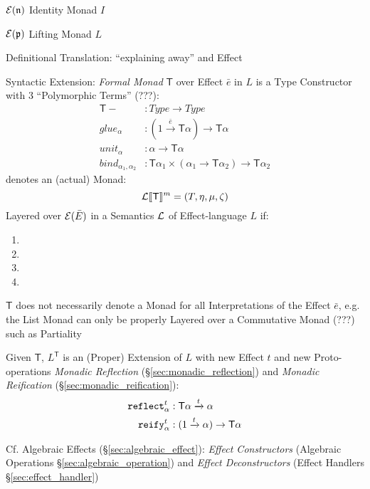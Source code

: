 $\mathcal{E}(\mathfrak{n})$ Identity Monad $I$

$\mathcal{E}(\mathfrak{p})$ Lifting Monad $L$

Definitional Translation: ``explaining away'' and Effect

Syntactic Extension: \emph{Formal Monad} $\mathsf{T}$ over Effect
$\bar{e}$ in $L$ is a Type Constructor with 3 ``Polymorphic Terms''
(???):
\begin{align*}
  \mathsf{T} - &: Type \rightarrow Type \\
  glue_\alpha &: (1 \xrightarrow{\bar{e}} \mathsf{T} \alpha)
    \rightarrow \mathsf{T} \alpha \\
  unit_\alpha &: \alpha \rightarrow \mathsf{T} \alpha \\
  bind_{\alpha_1,\alpha_2} &: \mathsf{T} \alpha_1 \times (\alpha_1
    \rightarrow \mathsf{T} \alpha_2) \rightarrow \mathsf{T} \alpha_2
\end{align*}
denotes an (actual) Monad:
\[
  \mathcal{L}\llbracket \mathsf{T} \rrbracket^m = (T,\eta,\mu,\zeta)
\]
Layered over $\mathcal{E}(\bar{E})$ in a Semantics $\mathcal{L}$ of
Effect-language $L$ if: %
\begin{enumerate}
  \item
  \item
  \item
  \item
\end{enumerate}

\fist $\mathsf{T}$ does not necessarily denote a Monad for all
Interpretations of the Effect $\bar{e}$, e.g. the List Monad can only
be properly Layered over a Commutative Monad (???) such as Partiality

Given $\mathsf{T}$, $L^\mathsf{T}$ is an (Proper) Extension of $L$
with new Effect $t$ and new Proto-operations \emph{Monadic Reflection}
(\S\ref{sec:monadic_reflection}) and \emph{Monadic Reification}
(\S\ref{sec:monadic_reification}):
\begin{align*}
  \mathtt{reflect}_\alpha^t &: \mathsf{T} \alpha \xrightarrow{t} \alpha \\
  \mathtt{reify}_\alpha^t &: (1 \xrightarrow{t} \alpha) \rightarrow
    \mathsf{T} \alpha
\end{align*}

\fist Cf. Algebraic Effects (\S\ref{sec:algebraic_effect}):
\emph{Effect Constructors} (Algebraic Operations
\S\ref{sec:algebraic_operation}) and \emph{Effect Deconstructors}
(Effect Handlers \S\ref{sec:effect_handler})

